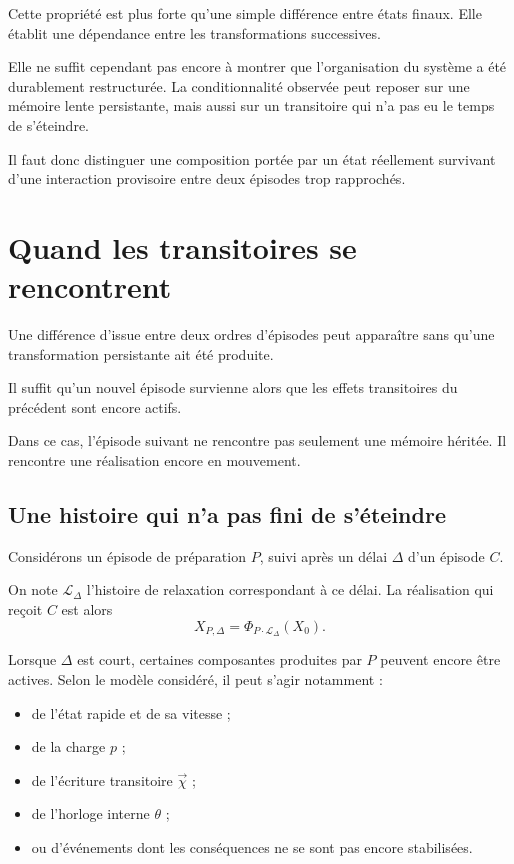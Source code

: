 Cette propriété est plus forte qu'une simple différence entre états finaux. Elle établit une dépendance entre les transformations successives.

Elle ne suffit cependant pas encore à montrer que l'organisation du système a été durablement restructurée. La conditionnalité observée peut reposer sur une mémoire lente persistante, mais aussi sur un transitoire qui n'a pas eu le temps de s'éteindre.

Il faut donc distinguer une composition portée par un état réellement survivant d'une interaction provisoire entre deux épisodes trop rapprochés.

\section{Quand les transitoires se rencontrent}
\label{t3-transitoires-se-rencontrent}

Une différence d'issue entre deux ordres d'épisodes peut apparaître sans qu'une transformation persistante ait été produite.

Il suffit qu'un nouvel épisode survienne alors que les effets transitoires du précédent sont encore actifs.

Dans ce cas, l'épisode suivant ne rencontre pas seulement une mémoire héritée. Il rencontre une réalisation encore en mouvement.

\subsection{Une histoire qui n'a pas fini de s'éteindre}

Considérons un épisode de préparation $P$, suivi après un délai $\Delta$ d'un épisode $C$.

On note
\(
\mathcal L_{\Delta}
\)
l'histoire de relaxation correspondant à ce délai. La réalisation qui reçoit $C$ est alors
\[
X_{P,\Delta}
=
\Phi_{P\cdot\mathcal L_{\Delta}}(X_0).
\]

Lorsque $\Delta$ est court, certaines composantes produites par $P$ peuvent encore être actives. Selon le modèle considéré, il peut s'agir notamment :

\begin{itemize}
\tightlist
\item
  de l'état rapide et de sa vitesse ;
\item
  de la charge $p$ ;
\item
  de l'écriture transitoire $\vec\chi$ ;
\item
  de l'horloge interne $\theta$ ;
\item
  ou d'événements dont les conséquences ne se sont pas encore stabilisées.
\end{itemize}

